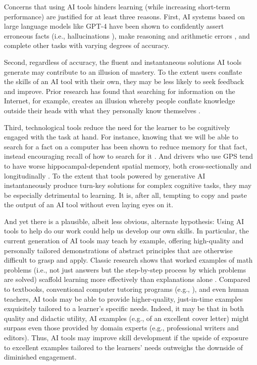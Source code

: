 \documentclass[11pt]{report}
\begin{document}
\begin{mainf}
Concerns that using AI tools hinders learning (while increasing short-term performance) are justified for at least three reasons. 
  First, AI systems based on large language models like GPT-4 have been shown to confidently assert erroneous facts (i.e., hallucinations \cite{ji2023survey}), make reasoning and arithmetic errors \cite{yuan2023well}, and complete other tasks with varying degrees of accuracy.
  
Second, regardless of accuracy, the fluent and instantaneous solutions AI tools generate may contribute to an illusion of mastery. 
  To the extent users conflate the skills of an AI tool with their own, they may be less likely to seek feedback and improve. 
  Prior research has found that searching for information on the Internet, for example, creates an illusion whereby people conflate knowledge outside their heads with what they personally know themselves \cite{fisher2015}.

Third, technological tools reduce the need for the learner to be cognitively engaged with the task at hand. 
  For instance, knowing that we will be able to search for a fact on a computer has been shown to reduce memory for that fact, instead encouraging recall of how to search for it \cite{sparrow2011}. 
  And drivers who use GPS tend to have worse hippocampal-dependent spatial memory, both cross-sectionally and longitudinally \cite{maguire2000, griesbauer2022london}. 
  To the extent that tools powered by generative AI instantaneously produce turn-key solutions for complex cognitive tasks, they may be especially detrimental to learning. 
  It is, after all, tempting to copy and paste the output of an AI tool without even laying eyes on it.  


And yet there is a plausible, albeit less obvious, alternate hypothesis: Using AI tools to help do our work could help us develop our own skills. 
    In particular, the current generation of AI tools may teach by example, offering high-quality and personally tailored demonstrations of abstract principles that are otherwise difficult to grasp and apply.
    Classic research shows that worked examples of math problems (i.e., not just answers but the step-by-step process by which problems are solved) scaffold learning more effectively than explanations alone \cite{sweller1985use, atkinson2000learning}. 
     Compared to textbooks, conventional computer tutoring programs (e.g., \cite{anderson1995cognitive}), and even human teachers, AI tools may be able to provide higher-quality, just-in-time examples exquisitely tailored to a learner's specific needs.  Indeed, it may be that in both quality and didactic utility, AI examples (e.g., of an excellent cover letter)  might surpass even those provided by domain experts (e.g., professional writers and editors).  
    Thus, AI tools may improve skill development if the upside of exposure to excellent examples tailored to the learners' needs outweighs the downside of diminished engagement. 


\end{mainf}
\end{document}
